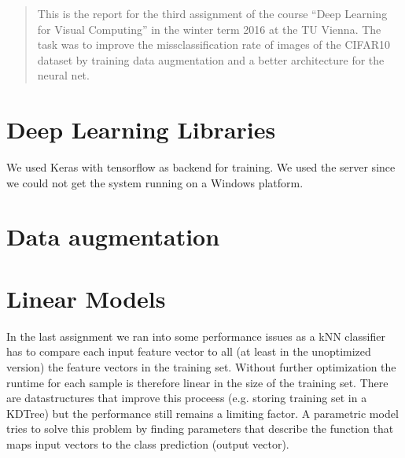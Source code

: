 \newcommand{\ttitle}{Image Classification with CNN}
\hyphenation{}
\maketitle
\begin{abstract}
This is the report for the third assignment of the course ``Deep Learning for Visual Computing'' in the winter term 2016 at the TU Vienna. The task was to improve the missclassification rate of images of  the CIFAR10~\cite{CIFAR10} dataset by training data augmentation and a better architecture for the neural net.
\end{abstract}

\section{Deep Learning Libraries}
We used Keras with tensorflow as backend for training. We used the server since we could not get the system running on a Windows platform. 

\section{Data augmentation}




\section{Linear Models}
In the last assignment we ran into some performance issues as a kNN classifier has to compare each input feature vector to all (at least in the unoptimized version) the feature vectors in the training set. Without further optimization the runtime for each sample is therefore linear in the size of the training set. There are datastructures that improve this proceess (e.g. storing training set in a KDTree) but the performance still remains a limiting factor. A parametric model tries to solve this problem by finding parameters that describe the function that maps  input vectors to the class prediction (output vector).

